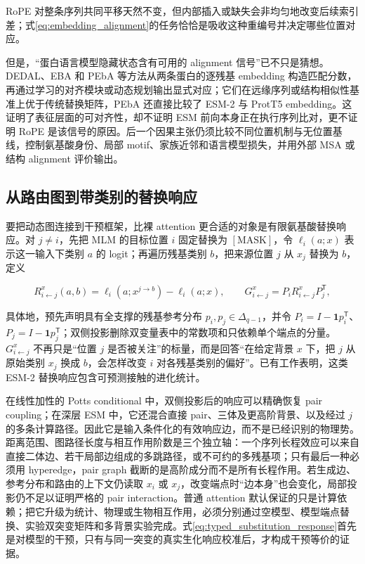 \documentclass[10pt]{article}
\begin{document}
RoPE 对整条序列共同平移天然不变，但内部插入或缺失会非均匀地改变后续索引差；式\eqref{eq:embedding_alignment}的任务恰恰是吸收这种重编号并决定哪些位置对应。

但是，“蛋白语言模型隐藏状态含有可用的 alignment 信号”已不只是猜想。DEDAL、EBA 和 PEbA 等方法从两条蛋白的逐残基 embedding 构造匹配分数，再通过学习的对齐模块或动态规划输出显式对应；它们在远缘序列或结构相似性基准上优于传统替换矩阵，PEbA 还直接比较了 ESM-2 与 ProtT5 embedding\cite{llinares2023,pantolini2024,iovino2024}。这证明了表征层面的\mbox{可对齐性}，却不证明 ESM 前向本身正在执行序列比对，更不证明 RoPE 是该信号的原因。后一个因果主张仍须比较不同位置机制与无位置基线，控制氨基酸身份、局部 motif、家族近邻和语言模型损失，并用外部 MSA 或结构 alignment 评价输出。

\subsection*{从路由图到带类别的替换响应}

要把动态图连接到干预框架，比裸 attention 更合适的对象是有限氨基酸替换响应。对 $j\neq i$，先把 MLM 的目标位置 $i$ 固定替换为 $[\mathrm{MASK}]$，令 $\ell_i(a;x)$ 表示这一输入下类别 $a$ 的 logit；再遍历残基类别 $b$，把来源位置 $j$ 从 $x_j$ 替换为 $b$，定义

\begin{equation}
R_{i\leftarrow j}^{x}(a,b)
=\ell_i(a;x^{j\to b})-\ell_i(a;x),
\qquad
G_{i\leftarrow j}^{x}=P_iR_{i\leftarrow j}^{x}P_j^{\mathsf T},
\label{eq:typed_substitution_response}
\end{equation}

具体地，预先声明具有全支撑的残基参考分布 $p_i,p_j\in\Delta_{q-1}$，并令 $P_i=I-\mathbf 1p_i^{\mathsf T}$、$P_j=I-\mathbf 1p_j^{\mathsf T}$；双侧投影删除双变量表中的常数项和只依赖单个端点的分量。$G_{i\leftarrow j}^{x}$ 不再只是“位置 $j$ 是否被关注”的标量，而是回答“在给定背景 $x$ 下，把 $j$ 从原始类别 $x_j$ 换成 $b$，会怎样改变 $i$ 对各残基类别的偏好”。已有工作表明，这类 ESM-2 替换响应包含可预测接触的进化统计\cite{zhang2024motifs}。

在线性加性的 Potts conditional 中，双侧投影后的响应可以精确恢复 pair coupling；在深层 ESM 中，它还混合直接 pair、三体及更高阶背景、以及经过 $j$ 的多条计算路径。因此它是输入条件化的\mbox{有效响应边}，而不是已经识别的物理势。距离范围、图路径长度与相互作用阶数是三个独立轴：一个序列长程效应可以来自直接二体边、若干局部边组成的多跳路径，或不可约的多残基项；只有最后一种必须用 hyperedge，pair graph 截断的是高阶成分而不是所有长程作用。若生成边、参考分布和路由的上下文仍读取 $x_i$ 或 $x_j$，改变端点时“边本身”也会变化，局部投影仍不足以证明严格的 pair interaction。普通 attention 默认保证的只是计算依赖；把它升级为统计、物理或生物相互作用，必须分别通过空模型、模型端点替换、实验双突变矩阵和多背景实验完成。式\eqref{eq:typed_substitution_response}首先是对模型的干预，只有与同一突变的真实生化响应校准后，才构成干预等价的证据。
\end{document}
